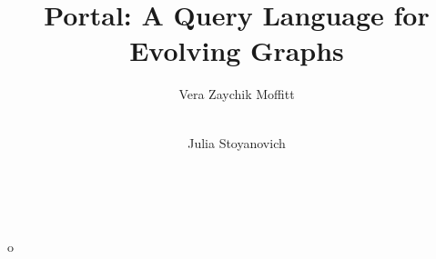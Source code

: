 o\documentclass{style/sig-alternate}
\begin{document}
\title{Portal: A Query Language for Evolving Graphs}

\author{
  \alignauthor Vera Zaychik Moffitt\\
  \\
    \and
%
  \alignauthor Julia Stoyanovich\\
  \\
    \\
}

\maketitle

\thispagestyle{empty}





%




\newpage




\end{document}
